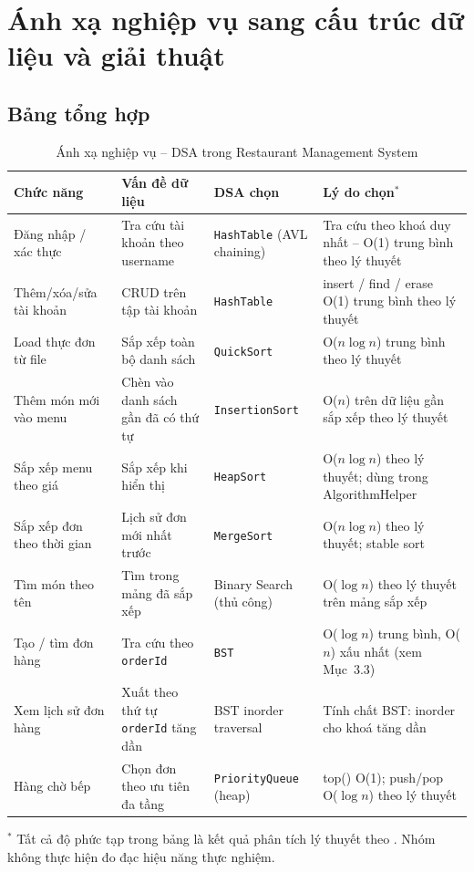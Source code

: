 \documentclass[12pt, a4paper]{article}
\begin{document}
\section{Ánh xạ nghiệp vụ sang cấu trúc dữ liệu và giải thuật}

\subsection{Bảng tổng hợp}

\begin{table}[H]
\centering
\renewcommand{\arraystretch}{1.5}
\begin{tabularx}{\textwidth}{|p{2.8cm}|p{3.1cm}|p{2.8cm}|X|}
\hline
\textbf{Chức năng} & \textbf{Vấn đề dữ liệu} & \textbf{DSA chọn} & \textbf{Lý do chọn$^*$} \\
\hline
Đăng nhập / xác thực & Tra cứu tài khoản theo username & \texttt{HashTable} (AVL chaining) & Tra cứu theo khoá duy nhất -- O(1) trung bình theo lý thuyết \\
\hline
Thêm/xóa/sửa tài khoản & CRUD trên tập tài khoản & \texttt{HashTable} & insert / find / erase O(1) trung bình theo lý thuyết \\
\hline
Load thực đơn từ file & Sắp xếp toàn bộ danh sách & \texttt{QuickSort} & O($n \log n$) trung bình theo lý thuyết \\
\hline
Thêm món mới vào menu & Chèn vào danh sách gần đã có thứ tự & \texttt{InsertionSort} & O($n$) trên dữ liệu gần sắp xếp theo lý thuyết \\
\hline
Sắp xếp menu theo giá & Sắp xếp khi hiển thị & \texttt{HeapSort} & O($n \log n$) theo lý thuyết; dùng trong AlgorithmHelper \\
\hline
Sắp xếp đơn theo thời gian & Lịch sử đơn mới nhất trước & \texttt{MergeSort} & O($n \log n$) theo lý thuyết; stable sort \\
\hline
Tìm món theo tên & Tìm trong mảng đã sắp xếp & Binary Search (thủ công) & O($\log n$) theo lý thuyết trên mảng sắp xếp \\
\hline
Tạo / tìm đơn hàng & Tra cứu theo \texttt{orderId} & \texttt{BST} & O($\log n$) trung bình, O($n$) xấu nhất (xem Mục~3.3) \\
\hline
Xem lịch sử đơn hàng & Xuất theo thứ tự \texttt{orderId} tăng dần & BST inorder traversal & Tính chất BST: inorder cho khoá tăng dần \\
\hline
Hàng chờ bếp & Chọn đơn theo ưu tiên đa tầng & \texttt{PriorityQueue} (heap) & top() O(1); push/pop O($\log n$) theo lý thuyết \\
\hline
\end{tabularx}
{\footnotesize $^*$ Tất cả độ phức tạp trong bảng là kết quả phân tích lý thuyết theo \cite{clrs}. Nhóm không thực hiện đo đạc hiệu năng thực nghiệm.}
\caption{Ánh xạ nghiệp vụ -- DSA trong Restaurant Management System}
\end{table}
\end{document}
